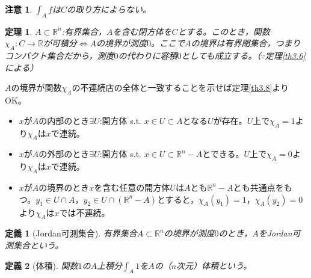 \documentclass[dvipdfmx,a4j,10pt]{jsarticle}
\makeatletter
\theoremstyle{mystyle1}
\newtheorem{thm}[dfn]{定理}
\theoremstyle{mystyle2}
\newtheorem{dfn*}{定義}
\newtheorem{note}{注意}
\renewenvironment{proof}[1][\proofname]{\par
  \pushQED{\qed}%
  \normalfont
  \topsep6\p@\@plus6\p@ \trivlist
  \item[\hskip\labelsep{\bfseries\sffamily #1}]\ignorespaces
}{%
  \popQED\endtrivlist\@endpefalse
}
\renewcommand\proofname{証明}
\makeatother
\begin{document}
\begin{note}
	$\displaystyle \int_A f$は$C$の取り方によらない。
\end{note}

\begin{framed}
	\begin{thm}
		$A\subset\mathbb{R}^n$:有界集合，$A$を含む閉方体を$C$とする。このとき，関数$\chi_A:C\to\mathbb{R}$が可積分$\Leftrightarrow$$A$の境界が測度$0$。ここで$A$の境界は有界閉集合，つまりコンパクト集合だから，測度$0$の代わりに容積$0$としても成立する。（$\because$定理\ref{th3.6}による）
	\end{thm}
\end{framed}

\begin{proof}
	$A$の境界が関数$\chi_A$の不連続店の全体と一致することを示せば定理\ref{th3.8}よりOK。
	\begin{itemize}
		\item $x$が$A$の内部のとき$\exists U$:開方体 s.t. $x\in U\subset A$となる$U$が存在。$U$上で$\chi_A=1$より$\chi_A$は$x$で連続。
		\item $x$が$A$の外部のとき$\exists U$:開方体 s.t. $x\in U\subset \mathbb{R}^n-A$とできる。$U$上で$\chi_A=0$より$\chi_A$は$x$で連続。
		\item $x$が$A$の境界のとき$x$を含む任意の開方体$U$は$A$とも$\mathbb{R}^n-A$とも共通点をもつ。$y_1\in U\cap A$，$y_2\in U\cap(\mathbb{R}^n-A)$とすると，$\chi_A(y_1)=1$，$\chi_A(y_2)=0$より$\chi_A$は$x$では不連続。
	\end{itemize}
\end{proof}

\begin{dfn*}[Jordan可測集合]
	有界集合$A\subset\mathbb{R}^n$の境界が測度$0$のとき，$A$をJordan可測集合という。
\end{dfn*}
\begin{dfn*}[体積]
	関数$1$の$A$上積分$\displaystyle \int_A 1$を$A$の（$n$次元）体積という。
\end{dfn*}


\newpage
\end{document}

